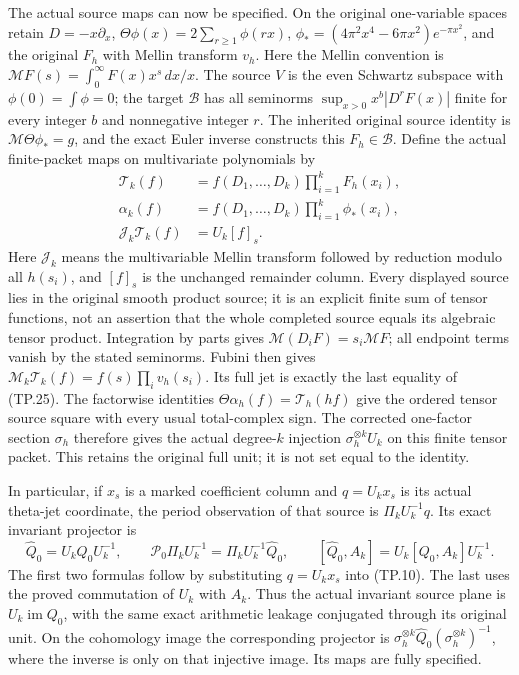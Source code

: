 The actual source maps can now be specified. On the
original one-variable spaces retain
\(D=-x\partial_x\),
\(\Theta\phi(x)=2\sum_{r\geq1}\phi(rx)\),
\(\phi_*=(4\pi^2x^4-6\pi x^2)e^{-\pi x^2}\), and
the original \(F_h\) with Mellin transform \(v_h\).
Here the Mellin convention is
\(\mathcal MF(s)=\int_0^\infty F(x)x^s\,dx/x\).
The source \(V\) is the even Schwartz subspace with
\(\phi(0)=\int\phi=0\); the target \(\mathscr B\)
has all seminorms \(\sup_{x>0}x^b|D^rF(x)|\) finite
for every integer \(b\) and nonnegative integer \(r\).
The inherited original source identity is
\(\mathcal M\Theta\phi_*=g\), and the exact Euler inverse
constructs this \(F_h\in\mathscr B\).
Define the actual finite-packet maps on multivariate
polynomials by
\[
 \begin{split}
 \mathcal T_k(f)&=f(D_1,\ldots,D_k)
                       \prod_{i=1}^k F_h(x_i),\\
 \alpha_k(f)&=f(D_1,\ldots,D_k)
                       \prod_{i=1}^k\phi_*(x_i),\\
 \mathcal J_k\mathcal T_k(f)&=U_k[f]_s.
 \end{split}
 \tag{TP.25}\label{eq:tp-source}
\]
Here \(\mathcal J_k\) means the multivariable Mellin
transform followed by reduction modulo all \(h(s_i)\),
and \([f]_s\) is the unchanged remainder column.
Every displayed source lies in the original smooth
product source; it is an explicit finite sum of tensor
functions, not an assertion that the whole completed
source equals its algebraic tensor product.
Integration by parts gives
\(\mathcal M(D_iF)=s_i\mathcal MF\); all endpoint
terms vanish by the stated seminorms. Fubini then gives
\(\mathcal M_k\mathcal T_k(f)=f(s)\prod_i v_h(s_i)\).
Its full jet is exactly the last equality of (TP.25).
The factorwise identities
\(\Theta\alpha_h(f)=\mathcal T_h(hf)\)
give the ordered tensor source square with every usual
total-complex sign. The corrected one-factor section
\(\sigma_h\) therefore gives the actual degree-\(k\)
injection \(\sigma_h^{\otimes k}U_k\) on this finite
tensor packet. This retains the original full unit;
it is not set equal to the identity.

In particular, if \(x_s\) is a marked coefficient column
and \(q=U_kx_s\) is its actual theta-jet coordinate,
the period observation of that source is
\(\Pi_kU_k^{-1}q\). Its exact invariant projector is
\[
 \widehat Q_0=U_kQ_0U_k^{-1},\qquad
 \mathcal P_0\Pi_kU_k^{-1}
      =\Pi_kU_k^{-1}\widehat Q_0,\qquad
 [\widehat Q_0,A_k]=U_k[Q_0,A_k]U_k^{-1}.
 \tag{TP.26}\label{eq:tp-sourceprojector}
\]
The first two formulas follow by substituting
\(q=U_kx_s\) into (TP.10). The last uses the proved
commutation of \(U_k\) with \(A_k\).
Thus the actual invariant source plane is
\(U_k\operatorname{im}Q_0\), with the same exact
arithmetic leakage conjugated through its original unit.
On the cohomology image the corresponding projector is
\(\sigma_h^{\otimes k}\widehat Q_0
(\sigma_h^{\otimes k})^{-1}\), where the inverse is
only on that injective image. Its maps are fully specified.

